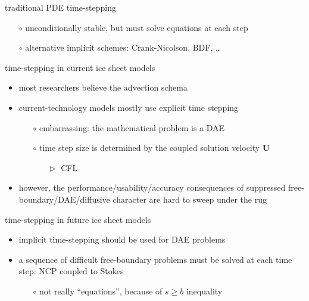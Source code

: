 \documentclass[svgnames,
               hyperref={colorlinks,citecolor=DeepPink4,linkcolor=FireBrick,urlcolor=Maroon},
               usepdftitle=false]  %
               {beamer}
\newcommand{\bU}{\mathbf{U}}
\begin{document}
\begin{frame}{traditional PDE time-stepping}
\begin{minipage}[t][60cm][t]{\textwidth}
\begin{itemize}
{    \begin{itemize}
    \item[$\circ$] unconditionally stable, but must solve equations at each step
    \item[$\circ$] alternative implicit schemes: Crank-Nicolson, BDF, \dots
    \end{itemize}
}
\end{itemize}
\end{minipage}
\end{frame}


\begin{frame}{time-stepping in current ice sheet models}

\begin{itemize}
\item most researchers believe the advection schema
\item current-technology models mostly use explicit time stepping
    \begin{itemize}
    \item[$\circ$] embarrassing: the mathematical problem is a DAE
    \item[$\circ$] time step size is determined by the coupled solution velocity $\bU$
         \begin{itemize}
         \item[$\vartriangleright$] CFL
         \end{itemize}
    \end{itemize}
\item however, the performance/usability/accuracy consequences of suppressed free-boundary/DAE/diffusive character are hard to sweep under the rug
\end{itemize}
\end{frame}


\begin{frame}{time-stepping in future ice sheet models}

\begin{itemize}
\item \alert{implicit time-stepping} should be used for DAE problems
\item a sequence of difficult free-boundary problems must be solved at each time step: \alert{NCP coupled to Stokes}
    \begin{itemize}
    \item[$\circ$] not really ``equations'', because of $s\ge b$ inequality
    \end{itemize}
\end{itemize}
\end{frame}
\end{document}
